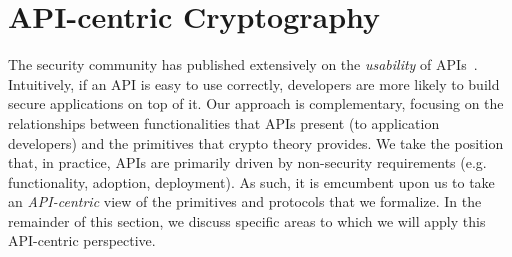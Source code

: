 \section{API-centric Cryptography}
The security community has published extensively on the \emph{usability} of
APIs~\cite{ABF+}.  Intuitively, if
an API is easy to use correctly, developers are more likely to build secure
applications on top of it.
%
Our approach is complementary, focusing on the relationships between
functionalities that APIs present (to application developers) and the primitives
that crypto theory provides. We take the position that, in practice, APIs are
primarily driven by non-security requirements (e.g. functionality, adoption,
deployment).
%
As such, it is emcumbent upon us to take an \emph{API-centric} view of the
primitives and protocols that we formalize.  
In the remainder of this section, we discuss specific
areas to which we will apply this API-centric perspective.  

